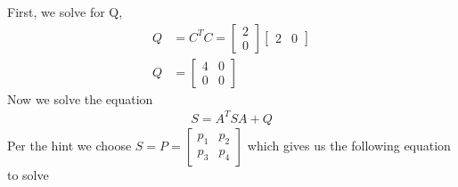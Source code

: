 \documentclass{article}
\begin{document}
  First, we solve for Q,
  \begin{align*}
	  Q&=C^TC = 
	  \begin{bmatrix}
		  2 \\
		  0
	  \end{bmatrix}
	  \begin{bmatrix}
		  2 & 0
	  \end{bmatrix} \\
	  Q&= 
	  \begin{bmatrix}
		  4 & 0 \\
		  0 & 0 
	  \end{bmatrix}
  \end{align*}
  Now we solve the equation
  \begin{align*}
	  S=A^TSA+Q
  \end{align*}
  Per the hint we choose $S=P=\begin{bmatrix}
			p_1 & p_2 \\
			p_3 & p_4
  \end{bmatrix}$
  which gives us the following equation to solve
\end{document}
